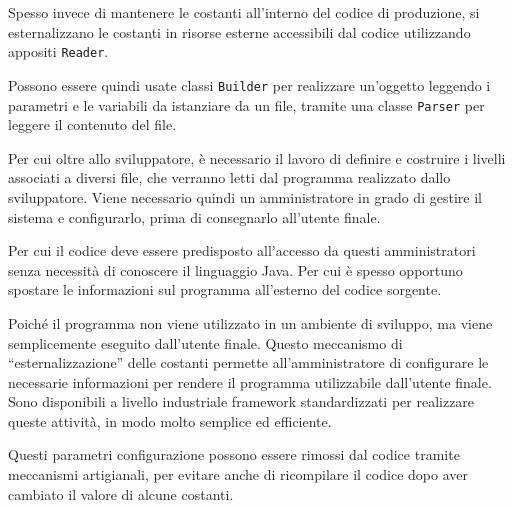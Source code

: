 \documentclass{article}
\numberwithin{equation}{subsection}
\begin{document}
Spesso invece di mantenere le costanti all'interno del codice di produzione, si esternalizzano le costanti in risorse esterne accessibili dal codice utilizzando appositi \verb|Reader|.  

Possono essere quindi usate classi \verb|Builder| per realizzare un'oggetto leggendo i parametri e le variabili da istanziare da un file, tramite una classe \verb|Parser| per 
leggere il contenuto del file. 

Per cui oltre allo sviluppatore, è necessario il lavoro di definire e costruire i livelli associati a diversi file, che verranno letti dal programma realizzato dallo 
sviluppatore. Viene necessario quindi un amministratore in grado di gestire il sistema e configurarlo, prima di consegnarlo all'utente finale. 

Per cui il codice deve essere predisposto all'accesso da questi amministratori senza necessità di conoscere il linguaggio Java. Per cui è spesso opportuno spostare le informazioni 
sul programma all'esterno del codice sorgente. 

Poiché il programma non viene utilizzato in un ambiente di sviluppo, ma viene semplicemente eseguito dall'utente finale. 
Questo meccanismo di ``esternalizzazione'' delle costanti permette all'amministratore di configurare le necessarie informazioni per rendere il programma utilizzabile dall'utente 
finale. 
Sono disponibili a livello industriale framework standardizzati per realizzare queste attività, in modo molto semplice ed efficiente. 

Questi parametri configurazione possono essere rimossi dal codice tramite meccanismi artigianali, per evitare anche di ricompilare il codice dopo aver cambiato il valore di 
alcune costanti. 
\end{document}
